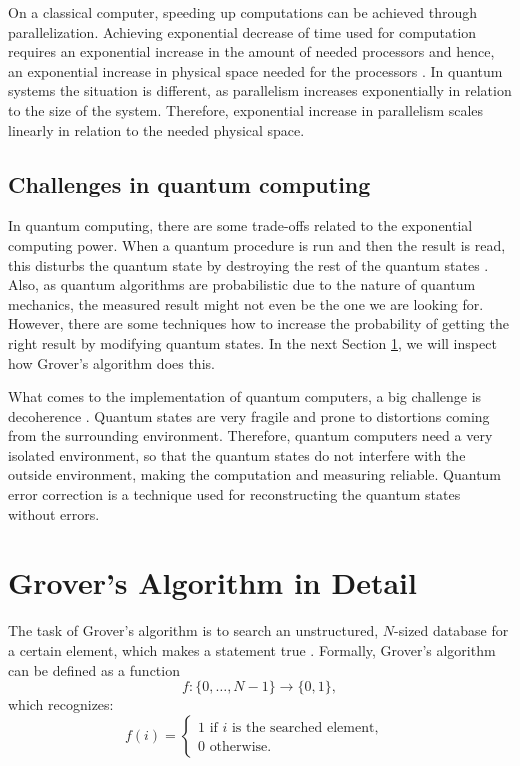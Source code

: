 \documentclass[english,oneside,openright]{UH_DS_report}
\begin{document}
On a classical computer, speeding up computations can be achieved through parallelization. Achieving exponential decrease of time used for computation requires an exponential increase in the amount of needed processors and hence, an exponential increase in physical space needed for the processors \cite{introtoqc}. In quantum systems the situation is different, as parallelism increases exponentially in relation to the size of the system. Therefore, exponential increase in parallelism scales linearly in relation to the needed physical space.

\subsection{Challenges in quantum computing}
In quantum computing, there are some trade-offs related to the exponential computing power. When a quantum procedure is run and then the result is read, this disturbs the quantum state by destroying the rest of the quantum states \cite{introtoqc}. Also, as quantum algorithms are probabilistic due to the nature of quantum mechanics, the measured result might not even be the one we are looking for. However, there are some techniques how to increase the probability of getting the right result by modifying quantum states. In the next Section \ref{detailedgrover}, we will inspect how Grover's algorithm does this.

What comes to the implementation of quantum computers, a big challenge is decoherence \cite{introtoqc}. Quantum states are very fragile and prone to distortions coming from the surrounding environment. Therefore, quantum computers need a very isolated environment, so that the quantum states do not interfere with the outside environment, making the computation and measuring reliable. Quantum error correction is a technique used for reconstructing the quantum states without errors.

\section{Grover's Algorithm in Detail}
\label{detailedgrover}
The task of Grover's algorithm is to search an unstructured, $N$-sized database for a certain element, which makes a statement true \cite{introtoqc}. Formally, Grover's algorithm can be defined as a function \cite{lavor2003grover}
\begin{equation}
    f : \{ 0, \ldots, N - 1 \} \rightarrow \{0, 1\},
\end{equation}
which recognizes:
\begin{equation}    
f(i) = 
\begin{cases}
    1 \textrm{ if $i$ is the searched element,} & \\ 0 \textrm{ otherwise.}
\end{cases}
\end{equation}
\end{document}
